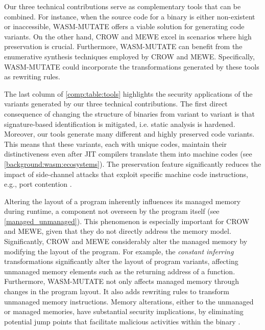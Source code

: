 \begin{tcolorbox}[title=Takeaway,boxrule=1pt,arc=.2em,boxsep=1.0mm]
    
    Our three technical contributions serve as complementary tools that can be combined.
    For instance, when the source code for a \Wasm binary is either non-existent or inaccessible, WASM-MUTATE offers a viable solution for generating code variants. 
    On the other hand, CROW and MEWE excel in scenarios where high preservation is crucial. Furthermore, WASM-MUTATE can benefit from the enumerative synthesis techniques employed by CROW and MEWE. 
    Specifically, WASM-MUTATE could incorporate the transformations generated by these tools as rewriting rules.
\end{tcolorbox}



The last column of \autoref{comp:table:tools} highlights the security applications of the variants generated by our three technical contributions.
The first direct consequence of changing the structure of \wasm binaries from variant to variant is that signature-based identification is mitigated, i.e. static analysis is hardened.
Moreover, our tools generate many different and highly preserved code variants. 
This means that these variants, each with unique \Wasm codes, maintain their distinctiveness even after JIT compilers translate them into machine codes (see \autoref{background:wasm:ecosystems}). 
The preservation feature significantly reduces the impact of side-channel attacks that exploit specific machine code instructions, e.g., port contention \cite{10.1145/3488932.3517411}.


Altering the layout of a \Wasm program inherently influences its managed memory during runtime, a component not overseen by the \Wasm program itself (see \autoref{managed_unmanaged}).
This phenomenon is especially important for CROW and MEWE, given that they do not directly address the \Wasm memory model.
Significantly, CROW and MEWE considerably alter the managed memory by modifying the layout of the \Wasm program.
For example, the \emph{constant inferring} transformations significantly alter the layout of program variants, affecting unmanaged memory elements such as the returning address of a function.
Furthermore, WASM-MUTATE not only affects managed memory through changes in the \Wasm program layout.
It also adds rewriting rules to transform unmanaged memory instructions.
Memory alterations, either to the unmanaged or managed memories, have substantial security implications, by eliminating potential jump points that facilitate malicious activities within the binary \cite{Swivel}.


